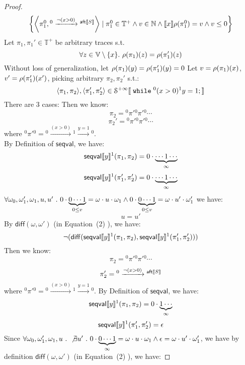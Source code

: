 \begin{example}
\begin{proof}
\begin{equation}
\begin{array}{ll}
 \left\{ \left< \pi_1^0, {}^0 \xrightarrow{\neg(x > 0)} {}^{\mathsf{aft}\sem{S}} \right> 
 \mid \pi_1^0 \in \mathbb{T^{+}} \land v \in \mathbb{N} \land
  \sem{x}\env(\pi_1^0) = v
 \land v \leq 0 \right\}
 \end{array} 
 \end{equation}
 Let $\pi_1, \pi_1' \in \mathbb{T^{+}}$ be arbitrary traces s.t. 
 $$\forall z \in \mathbb{V}\setminus \{x\}. ~ \rho(\pi_1)(z) = \rho(\pi_1')(z) $$ 
 Without loss of generalization, let $\rho(\pi_1)(y) = \rho(\pi_1')(y) = 0$
 Let $v = \rho(\pi_1)(x) $, $v' = \rho(\pi'_1)(x')$, picking arbitrary $\pi_2, \pi_2'$ s.t.:
 \[
 	\left< \pi_1, \pi_2 \right>,  \left< \pi'_1, \pi'_2 \right> 
  \in \mathcal{S}^{+\infty}\sem{\ewhile {}^0 (x > 0) {}^1 y = 1; }
 \]
 There are 3 cases:
 Then we know:
 \[
 \pi_2 = {}^0 \pi' {}^0 \pi' {}^0\cdots 
\]
%
\[ 
 \pi_2' = {}^0 \pi' {}^0 \pi' {}^0\cdots 
 \]
 where ${}^0 \pi' {}^0 = {}^0 \xrightarrow{(x > 0)} {}^1 \xrightarrow{y = 1} {}^0$.
 \\
 By Definition of $\mathsf{seqval}$, we have:
 \[
  \mathsf{seqval}\llbracket y \rrbracket{}^1(\pi_1, \pi_2 ) =  0 \cdot \underbrace{ \cdots 1 \cdots}_{\infty}
 \]
 \[
  \mathsf{seqval}\llbracket y \rrbracket{}^1(\pi_1', \pi_2' ) =  0 \cdot \underbrace{\cdots 1  \cdots}_{\infty}
 \]
  $\forall \omega_0, \omega_1', \omega_1, u, u' ~.~ 
  0 \cdot \underbrace{0 \cdots 1}_{0 \leq v} = \omega \cdot u \cdot \omega_1 
  \land 0 \cdot \underbrace{0 \cdots 1}_{0 \leq v} = \omega \cdot u' \cdot \omega_1'$ we have:
 \[
  u = u'
 \]
 By $\mathsf{diff}(\omega, \omega')$ (in \cite{cousot2019abstract} Equation~(2) ), we have:
 \[
  \neg(\mathsf{diff}(\mathsf{seqval}\llbracket y \rrbracket{}^1(\pi_1, \pi_2 ), \mathsf{seqval}\llbracket y \rrbracket{}^1(\pi_1', \pi_2' )))
 \]
 Then we know:
  \[
  \pi_2 = {}^0 \pi' {}^0 \pi' {}^0 \cdots 
  \]
  \[
  \pi_2' = {}^0 \xrightarrow{\neg(x > 0)} {}^{\mathsf{aft}\llbracket S \rrbracket}
  \]
 where ${}^0 \pi' {}^0 = {}^0 \xrightarrow{(x > 0)} {}^1 \xrightarrow{y = 1} {}^0$.
 By Definition of $\mathsf{seqval}$, we have:
 \[
  \mathsf{seqval}\llbracket y \rrbracket{}^1(\pi_1, \pi_2 ) = 0 \cdot \underbrace{1 \cdots}_{\infty}
 \]
 \[
  \mathsf{seqval}\llbracket y \rrbracket{}^1(\pi'_1, \pi_2' ) = \epsilon
 \]
 Since $\forall \omega_0, \omega_1', \omega_1, u~.~ \not\exists u' ~.~ 
  0 \cdot \underbrace{0 \cdots 1}_{\infty} = \omega \cdot u \cdot \omega_1 
  \land \epsilon = \omega \cdot u' \cdot \omega_1'$,
 we have by definition $\mathsf{diff}(\omega, \omega')$ (in \cite{cousot2019abstract} Equation~(2) ), we have:

\end{proof}
\end{example}
